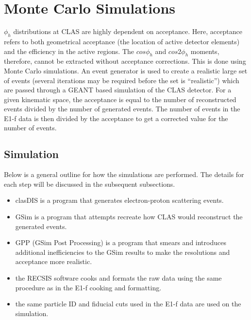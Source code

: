 \chapter{Monte Carlo Simulations}
\label{cha:MonteCarlo}
%
$\phi_h$ distributions at CLAS are highly dependent on acceptance.
Here, acceptance refers to both geometrical acceptance (the location of active detector elements) and the efficiency in the active regions.
The $cos\phi_h$ and $cos2\phi_h$ moments, therefore, cannot be extracted without acceptance corrections.
This is done using Monte Carlo simulations.
An event generator is used to create a realistic large set of events (several iterations may be required before the set is ``realistic'') which are passed through a GEANT based simulation of the CLAS detector.
For a given kinematic space, the acceptance is equal to the number of reconstructed events divided by the number of generated events.
The number of events in the E1-f data is then divided by the acceptance to get a corrected value for the number of events.
%
\section{Simulation}
\label{sec:Simulation}
%
Below is a general outline for how the simulations are performed.
The details for each step will be discussed in the subsequent subsections.
\begin{itemize}
\item clasDIS is a program that generates electron-proton scattering events.
\item GSim is a program that attempts recreate how CLAS would reconstruct the generated events.
\item GPP (GSim Post Processing) is a program that smears and introduces additional inefficiencies to the GSim results to make the resolutions and acceptance more realistic.
\item the RECSIS software cooks and formats the raw data using the same procedure as in the E1-f cooking and formatting.
\item the same particle ID and fiducial cuts used in the E1-f data are used on the simulation.
\end{itemize}
%
